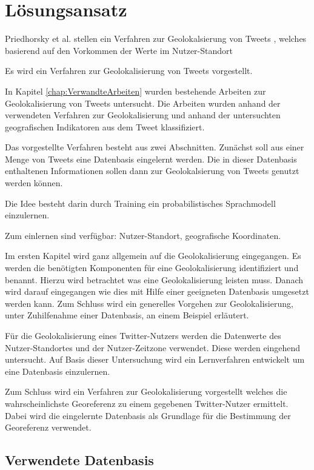 \chapter{Lösungsansatz} \label{chp:Loesungsansatz}

	Priedhorsky et al. \cite{Priedhorsky2013} stellen ein Verfahren zur Geolokalsierung von Tweets , welches basierend auf den Vorkommen der Werte im Nutzer-Standort

	Es wird ein Verfahren zur Geolokalisierung von Tweets vorgestellt.

	In Kapitel \ref{chap:VerwandteArbeiten} wurden bestehende Arbeiten zur Geolokalisierung von Tweets untersucht.
	Die Arbeiten wurden anhand der verwendeten Verfahren zur Geolokalisierung und anhand der untersuchten geografischen Indikatoren aus dem Tweet klassifiziert. 

	Das vorgestellte Verfahren besteht aus zwei Abschnitten. 
	Zunächst soll aus einer Menge von Tweets eine Datenbasis eingelernt werden.
	Die in dieser Datenbasis enthaltenen Informationen sollen dann zur Geolokalsierung von Tweets genutzt werden können.

	Die Idee besteht darin durch Training ein probabilistisches Sprachmodell einzulernen.


	Zum einlernen sind verfügbar: Nutzer-Standort, geografische Koordinaten.


	Im ersten Kapitel wird ganz allgemein auf die Geolokalisierung eingegangen.
	Es werden die benötigten Komponenten für eine Geolokalisierung identifiziert und benannt.
	Hierzu wird betrachtet was eine Geolokalisierung leisten muss.
	Danach wird darauf eingegangen wie dies mit Hilfe einer geeigneten Datenbasis umgesetzt werden kann.
	Zum Schluss wird ein generelles Vorgehen zur Geolokalisierung, unter Zuhilfenahme einer Datenbasis, an einem Beispiel erläutert.

	Für die Geolokalisierung eines Twitter-Nutzers werden die Datenwerte des Nutzer-Standortes und der Nutzer-Zeitzone verwendet.
	Diese werden eingehend untersucht.
	Auf Basis dieser Untersuchung wird ein Lernverfahren entwickelt um eine Datenbasis einzulernen.

	Zum Schluss wird ein Verfahren zur Geolokalisierung vorgestellt welches die wahrscheinlichste Georeferenz zu einem gegebenen Twitter-Nutzer ermittelt.
	Dabei wird die eingelernte Datenbasis als Grundlage für die Bestimmung der Georeferenz verwendet.

	\section{Verwendete Datenbasis}

